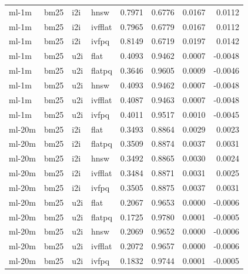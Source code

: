 \begin{tabular}{llllrrrr}
ml-1m & bm25 & i2i & hnsw & 0.7971 & 0.6776 & 0.0167 & 0.0112 \\
ml-1m & bm25 & i2i & ivfflat & 0.7965 & 0.6779 & 0.0167 & 0.0112 \\
ml-1m & bm25 & i2i & ivfpq & 0.8149 & 0.6719 & 0.0197 & 0.0142 \\
ml-1m & bm25 & u2i & flat & 0.4093 & 0.9462 & 0.0007 & -0.0048 \\
ml-1m & bm25 & u2i & flatpq & 0.3646 & 0.9605 & 0.0009 & -0.0046 \\
ml-1m & bm25 & u2i & hnsw & 0.4093 & 0.9462 & 0.0007 & -0.0048 \\
ml-1m & bm25 & u2i & ivfflat & 0.4087 & 0.9463 & 0.0007 & -0.0048 \\
ml-1m & bm25 & u2i & ivfpq & 0.4011 & 0.9517 & 0.0010 & -0.0045 \\
ml-20m & bm25 & i2i & flat & 0.3493 & 0.8864 & 0.0029 & 0.0023 \\
ml-20m & bm25 & i2i & flatpq & 0.3509 & 0.8874 & 0.0037 & 0.0031 \\
ml-20m & bm25 & i2i & hnsw & 0.3492 & 0.8865 & 0.0030 & 0.0024 \\
ml-20m & bm25 & i2i & ivfflat & 0.3484 & 0.8871 & 0.0031 & 0.0025 \\
ml-20m & bm25 & i2i & ivfpq & 0.3505 & 0.8875 & 0.0037 & 0.0031 \\
ml-20m & bm25 & u2i & flat & 0.2067 & 0.9653 & 0.0000 & -0.0006 \\
ml-20m & bm25 & u2i & flatpq & 0.1725 & 0.9780 & 0.0001 & -0.0005 \\
ml-20m & bm25 & u2i & hnsw & 0.2069 & 0.9652 & 0.0000 & -0.0006 \\
ml-20m & bm25 & u2i & ivfflat & 0.2072 & 0.9657 & 0.0000 & -0.0006 \\
ml-20m & bm25 & u2i & ivfpq & 0.1832 & 0.9744 & 0.0001 & -0.0005 \\
\bottomrule
\end{tabular}

